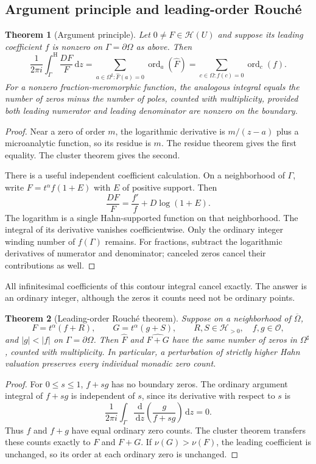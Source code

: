 \documentclass[11pt,oneside]{article}
\newtheorem{theorem}{Theorem}[section]
\theoremstyle{definition}\newtheorem{definition}[theorem]{Definition}
\newcommand{\HH}{\mathcal H}
\newcommand{\OO}{\mathcal O}
\newcommand{\ord}{\operatorname{ord}}
\newcommand{\dd}{\,\mathrm d}
\newcommand{\hatF}{\widehat F}
\newcommand{\val}{\nu}
\newcommand{\htop}{\mathrm H}
\begin{document}
\subsection{Argument principle and leading-order Rouch\'e}
\begin{theorem}[Argument principle]\label{thm:argument}
Let $0\ne F\in\HH(U)$ and suppose its leading coefficient $f$ is nonzero on $\Gamma=\partial\Omega$ as above. Then
\begin{equation}\label{eq:argument}
 \frac1{2\pi i}\int_\Gamma^{\htop}\frac{DF}{F}\dd z
 =\sum_{a\in\Omega^\sharp:\hatF(a)=0}\ord_a(\hatF)
 =\sum_{c\in\Omega:f(c)=0}\ord_c(f).
\end{equation}
For a nonzero fraction-meromorphic function, the analogous integral equals the number of zeros minus the number of poles, counted with multiplicity, provided both leading numerator and leading denominator are nonzero on the boundary.
\end{theorem}
\begin{proof}
Near a zero of order $m$, the logarithmic derivative is $m/(z-a)$ plus a microanalytic function, so its residue is $m$. The residue theorem gives the first equality. The cluster theorem gives the second.

There is a useful independent coefficient calculation. On a neighborhood of $\Gamma$, write $F=t^\alpha f(1+E)$ with $E$ of positive support. Then
\[
 \frac{DF}{F}=\frac{f'}f+D\log(1+E).
\]
The logarithm is a single Hahn-supported function on that neighborhood. The integral of its derivative vanishes coefficientwise. Only the ordinary integer winding number of $f(\Gamma)$ remains. For fractions, subtract the logarithmic derivatives of numerator and denominator; canceled zeros cancel their contributions as well.
\end{proof}
All infinitesimal coefficients of this contour integral cancel exactly. The answer is an ordinary integer, although the zeros it counts need not be ordinary points.

\begin{theorem}[Leading-order Rouch\'e theorem]\label{thm:rouche}
Suppose on a neighborhood of $\overline\Omega$,
\[
 F=t^\alpha(f+R),\qquad G=t^\alpha(g+S),
 \qquad R,S\in\HH_{>0},\quad f,g\in\OO,
\]
and $|g|<|f|$ on $\Gamma=\partial\Omega$. Then $\hatF$ and $\widehat{F+G}$ have the same number of zeros in $\Omega^\sharp$, counted with multiplicity. In particular, a perturbation of strictly higher Hahn valuation preserves every individual monadic zero count.
\end{theorem}
\begin{proof}
For $0\leq s\leq1$, $f+sg$ has no boundary zeros. The ordinary argument integral of $f+sg$ is independent of $s$, since its derivative with respect to $s$ is
\[
 \frac1{2\pi i}\int_\Gamma
  \frac{\dd}{\dd z}\left(\frac{g}{f+sg}\right)\dd z=0.
\]
Thus $f$ and $f+g$ have equal ordinary zero counts. The cluster theorem transfers these counts exactly to $F$ and $F+G$. If $\val(G)>\val(F)$, the leading coefficient is unchanged, so its order at each ordinary zero is unchanged.
\end{proof}
\end{document}
